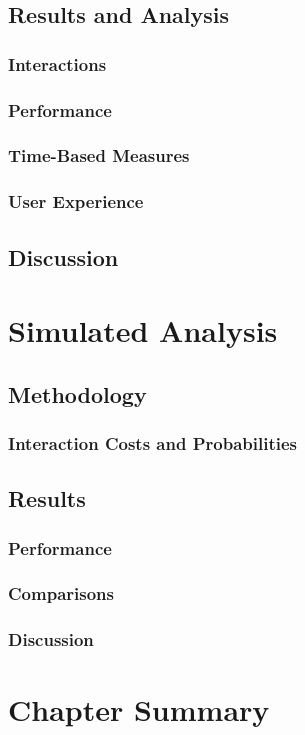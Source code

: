 \subsection{Results and Analysis}

\subsubsection{Interactions}

\subsubsection{Performance}

\subsubsection{Time-Based Measures}

\subsubsection{User Experience}

\subsection{Discussion}

\section{Simulated Analysis}\label{chap:snippets:simulations}

\subsection{Methodology}

\subsubsection{Interaction Costs and Probabilities}

\subsection{Results}

\subsubsection{Performance}

\subsubsection{Comparisons}

\subsubsection{Discussion}

\section{Chapter Summary}